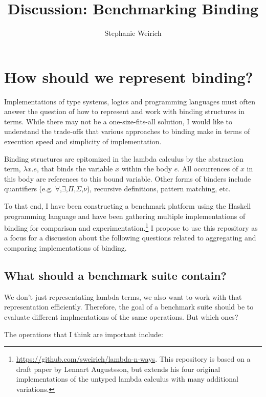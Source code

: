 \documentclass[sigplan]{acmart}
\title{Discussion: Benchmarking Binding}
\author{Stephanie Weirich
}
\begin{document}



\maketitle

\section{How should we represent binding?}

Implementations of type systems, logics and programming languages must often
answer the question of how to represent and work with binding structures in
terms. While there may not be a one-size-fits-all solution, I would like to
understand the trade-offs that various approaches to binding make in terms of
execution speed and simplicity of implementation.

Binding structures are epitomized in the lambda calculus by the abstraction
term, $\lambda x. e$, that binds the variable $x$ within the body $e$. All
occurrences of $x$ in this body are references to this bound variable. Other
forms of binders include quantifiers
(e.g. $\forall$,$\exists$,$\Pi$,$\Sigma$,$\nu$), recursive definitions,
pattern matching, etc.

To that end, I have been constructing a benchmark platform using the Haskell
programming language and have been gathering multiple implementations of
binding for comparison and
experimentation.\footnote{\url{https://github.com/sweirich/lambda-n-ways}.
This repository is based on a draft paper by Lennart Augustsson, but extends
his four original implementations of the untyped lambda calculus with many
additional variations.}
%
I propose to use this repository as a focus for a discussion about the
following questions related to aggregating and comparing implementations of
binding.

\subsection{What should a benchmark suite contain?}

We don't just representating lambda terms, we also want to work with that
representation efficiently. Therefore, the goal of a benchmark suite should be
to evaluate different implmentations of the same operations. But which ones?

The operations that I think are important include:
\end{document}
